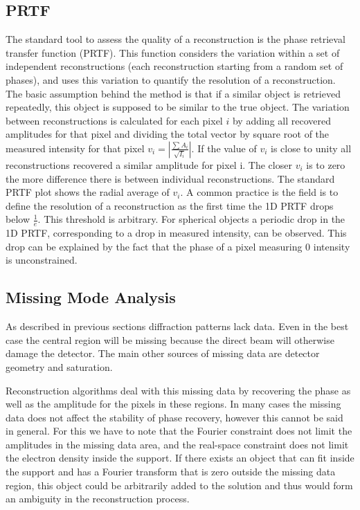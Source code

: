 \subsection{PRTF}
The standard tool to assess the quality of a reconstruction is the phase retrieval transfer function (PRTF). This function considers the variation within a set of independent reconstructions (each reconstruction starting from a random set of phases), and uses this variation to quantify the resolution of a reconstruction. The basic assumption behind the method is that if a similar object is retrieved repeatedly, this object is supposed to be similar to the true object. The variation between reconstructions is calculated for each pixel $i$ by adding all recovered amplitudes for that pixel and dividing the total vector by square root of the measured intensity for that pixel $v_i = |\frac{\sum A_i}{\sqrt{I_i}}|$. If the value of $v_i$ is close to unity all reconstructions recovered a similar amplitude for pixel i. The closer $v_i$ is to zero the more difference there is between individual reconstructions. The standard PRTF plot shows the radial average of $v_i$. A common practice is the field is to define the resolution of a reconstruction as the first time the 1D PRTF drops below $\frac{1}{e}$. This threshold is arbitrary. For spherical objects a periodic drop in the 1D PRTF, corresponding to a drop in measured intensity, can be observed. This drop can be explained by the fact that the phase of a pixel measuring 0 intensity is unconstrained.
 
\subsection{Missing Mode Analysis}
As described in previous sections diffraction patterns lack data. Even in the best case the central region will be missing because the direct beam will otherwise damage the detector. The main other sources of missing data are detector geometry and saturation. 

Reconstruction algorithms deal with this missing data by recovering the phase as well as the amplitude for the pixels in these regions. In many cases the missing data does not affect the stability of phase recovery, however this cannot be said in general. For this we have to note that the Fourier constraint does not limit the amplitudes in the missing data area, and the real-space constraint does not limit the electron density inside the support. If there exists an object that can fit inside the support and has a Fourier transform that is zero outside the missing data region, this object could be arbitrarily added to the solution and thus would form an ambiguity in the reconstruction process.

